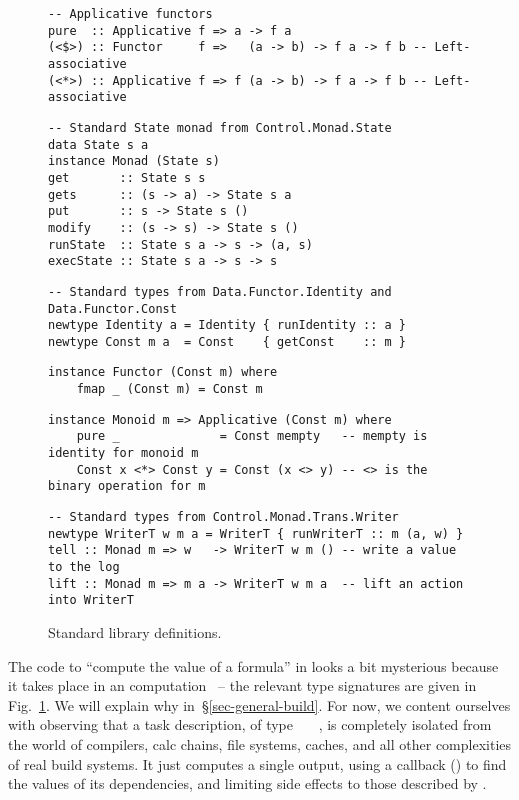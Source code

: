 \begin{figure}
\begin{verbatim}
-- Applicative functors
pure  :: Applicative f => a -> f a
(<$>) :: Functor     f =>   (a -> b) -> f a -> f b -- Left-associative
(<*>) :: Applicative f => f (a -> b) -> f a -> f b -- Left-associative
\end{verbatim}
\vspace{1mm}
\begin{verbatim}
-- Standard State monad from Control.Monad.State
data State s a
instance Monad (State s)
get       :: State s s
gets      :: (s -> a) -> State s a
put       :: s -> State s ()
modify    :: (s -> s) -> State s ()
runState  :: State s a -> s -> (a, s)
execState :: State s a -> s -> s
\end{verbatim}
\vspace{1mm}
\begin{verbatim}
-- Standard types from Data.Functor.Identity and Data.Functor.Const
newtype Identity a = Identity { runIdentity :: a }
newtype Const m a  = Const    { getConst    :: m }
\end{verbatim}
\vspace{1mm}
\begin{verbatim}
instance Functor (Const m) where
    fmap _ (Const m) = Const m
\end{verbatim}
\vspace{1mm}
\begin{verbatim}
instance Monoid m => Applicative (Const m) where
    pure _              = Const mempty   -- mempty is identity for monoid m
    Const x <*> Const y = Const (x <> y) -- <> is the binary operation for m
\end{verbatim}
\vspace{1mm}
\begin{verbatim}
-- Standard types from Control.Monad.Trans.Writer
newtype WriterT w m a = WriterT { runWriterT :: m (a, w) }
tell :: Monad m => w   -> WriterT w m () -- write a value to the log
lift :: Monad m => m a -> WriterT w m a  -- lift an action into WriterT
\end{verbatim}

\caption{Standard library definitions.}\label{fig-stdlib}
\end{figure}

The code to ``compute the value of a formula'' in  looks a bit
mysterious because it takes place in an 
computation~\cite{mcbride2008applicative} -- the relevant type signatures are
given in Fig.~\ref{fig-stdlib}. We will explain why in~\S\ref{sec-general-build}.
For now, we content ourselves with observing that a task description, of type
~~~, is completely isolated from the world of
compilers, calc chains, file systems, caches, and all other complexities of real
build systems. It just computes a single output,
using a callback () to find the values of its dependencies,
and limiting side effects to those described by .

